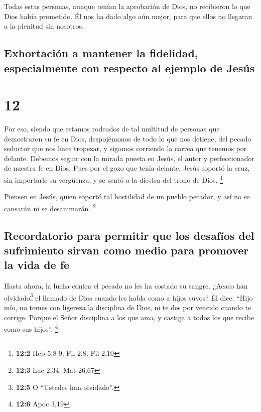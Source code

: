  Todas estas personas, aunque tenían la aprobación de
Dios, no recibieron lo que Dios había prometido.  Él nos
ha dado algo aún mejor, para que ellos no llegaran a la plenitud sin
nosotros.

\hypertarget{exhortaciuxf3n-a-mantener-la-fidelidad-especialmente-con-respecto-al-ejemplo-de-jesuxfas}{%
\subsection{Exhortación a mantener la fidelidad, especialmente con
respecto al ejemplo de
Jesús}\label{exhortaciuxf3n-a-mantener-la-fidelidad-especialmente-con-respecto-al-ejemplo-de-jesuxfas}}

\hypertarget{section-11}{%
\section{12}\label{section-11}}

 Por eso, siendo que estamos rodeados de tal multitud de
personas que demostraron su fe en Dios, despojémonos de todo lo que nos
detiene, del pecado seductor que nos hace tropezar, y sigamos corriendo
la carrea que tenemos por delante.  Debemos seguir con la
mirada puesta en Jesús, el autor y perfeccionador de nuestra fe en Dios.
Pues por el gozo que tenía delante, Jesús soportó la cruz, sin
importarle su vergüenza, y se sentó a la diestra del trono de Dios.
\footnote{\textbf{12:2} Heb 5,8-9; Fil 2,8; Fil 2,10}

 Piensen en Jesús, quien soportó tal hostilidad de un
pueblo pecador, y así no se cansarán ni se desanimarán. \footnote{\textbf{12:3}
  Luc 2,34; Mat 26,67}

\hypertarget{recordatorio-para-permitir-que-los-desafuxedos-del-sufrimiento-sirvan-como-medio-para-promover-la-vida-de-fe}{%
\subsection{Recordatorio para permitir que los desafíos del sufrimiento
sirvan como medio para promover la vida de
fe}\label{recordatorio-para-permitir-que-los-desafuxedos-del-sufrimiento-sirvan-como-medio-para-promover-la-vida-de-fe}}

 Hasta ahora, la lucha contra el pecado no les ha costado
su sangre.  ¿Acaso han olvidado\footnote{\textbf{12:5} O
  ``Ustedes han olvidado''.} el llamado de Dios cuando les habla como a
hijos suyos? Él dice: ``Hijo mío, no tomes con ligereza la disciplina de
Dios, ni te des por vencido cuando te corrige.  Porque el
Señor disciplina a los que ama, y castiga a todos los que recibe como
sus hijos''. \footnote{\textbf{12:6} Apoc 3,19}

